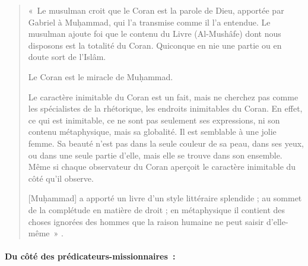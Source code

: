   


\begin{quote}
    

«~Le musulman croit que le Coran est la parole de Dieu, apportée par
Gabriel à Muḥammad, qui l'a transmise comme il l'a entendue. Le musulman
ajoute foi que le contenu du Livre (Al-Mushâfe) dont nous disposons est
la totalité du Coran. Quiconque en nie une partie ou en doute sort de
l'Islâm.

Le Coran est le miracle de Muḥammad.

Le caractère inimitable du Coran est un fait, mais ne cherchez pas comme
les spécialistes de la rhétorique, les endroits inimitables du Coran. En
effet, ce qui est inimitable, ce ne sont pas seulement ses expressions,
ni son contenu métaphysique, mais sa globalité. Il est semblable à une
jolie femme. Sa beauté n'est pas dans la seule couleur de sa peau, dans
ses yeux, ou dans une seule partie d'elle, mais elle se trouve dans son
ensemble. Même si chaque observateur du Coran aperçoit le caractère
inimitable du côté qu'il observe.
 
{[}Muḥammad{]} a apporté un livre d'un style littéraire splendide ; au
sommet de la complétude en matière de droit ; en métaphysique il
contient des choses ignorées des hommes que la raison humaine ne peut
saisir d'elle-même~»
.
  
\end{quote}



\paragraph{Du côté des prédicateurs-missionnaires~:
}

